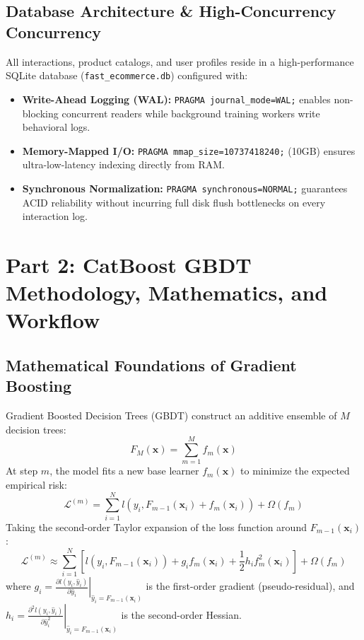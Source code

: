 \documentclass[11pt,a4paper]{article}
\begin{document}
\subsection{Database Architecture \& High-Concurrency Concurrency}
All interactions, product catalogs, and user profiles reside in a high-performance SQLite database (\texttt{fast\_ecommerce.db}) configured with:
\begin{itemize}
    \item \textbf{Write-Ahead Logging (WAL):} \texttt{PRAGMA journal\_mode=WAL;} enables non-blocking concurrent readers while background training workers write behavioral logs.
    \item \textbf{Memory-Mapped I/O:} \texttt{PRAGMA mmap\_size=10737418240;} (10GB) ensures ultra-low-latency indexing directly from RAM.
    \item \textbf{Synchronous Normalization:} \texttt{PRAGMA synchronous=NORMAL;} guarantees ACID reliability without incurring full disk flush bottlenecks on every interaction log.
\end{itemize}

\newpage
\section{Part 2: CatBoost GBDT Methodology, Mathematics, and Workflow}

\subsection{Mathematical Foundations of Gradient Boosting}
Gradient Boosted Decision Trees (GBDT) construct an additive ensemble of $M$ decision trees:
\begin{equation}
    F_M(\mathbf{x}) = \sum_{m=1}^M f_m(\mathbf{x})
\end{equation}
At step $m$, the model fits a new base learner $f_m(\mathbf{x})$ to minimize the expected empirical risk:
\begin{equation}
    \mathcal{L}^{(m)} = \sum_{i=1}^N l\left(y_i, F_{m-1}(\mathbf{x}_i) + f_m(\mathbf{x}_i)\right) + \Omega(f_m)
\end{equation}
Taking the second-order Taylor expansion of the loss function around $F_{m-1}(\mathbf{x}_i)$:
\begin{equation}
    \mathcal{L}^{(m)} \approx \sum_{i=1}^N \left[ l(y_i, F_{m-1}(\mathbf{x}_i)) + g_i f_m(\mathbf{x}_i) + \frac{1}{2} h_i f_m^2(\mathbf{x}_i) \right] + \Omega(f_m)
\end{equation}
where $g_i = \left. \frac{\partial l(y_i, \hat{y}_i)}{\partial \hat{y}_i} \right|_{\hat{y}_i = F_{m-1}(\mathbf{x}_i)}$ is the first-order gradient (pseudo-residual), and $h_i = \left. \frac{\partial^2 l(y_i, \hat{y}_i)}{\partial \hat{y}_i^2} \right|_{\hat{y}_i = F_{m-1}(\mathbf{x}_i)}$ is the second-order Hessian.
\end{document}
